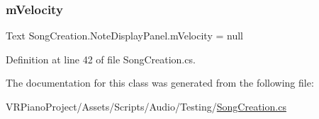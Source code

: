 \subsubsection{\texorpdfstring{m\+Velocity}{mVelocity}}
{\footnotesize\ttfamily Text Song\+Creation.\+Note\+Display\+Panel.\+m\+Velocity = null\hspace{0.3cm}{\ttfamily [private]}}



Definition at line 42 of file Song\+Creation.\+cs.



The documentation for this class was generated from the following file\+:\begin{DoxyCompactItemize}
\item 
V\+R\+Piano\+Project/\+Assets/\+Scripts/\+Audio/\+Testing/\hyperlink{_song_creation_8cs}{Song\+Creation.\+cs}\end{DoxyCompactItemize}
